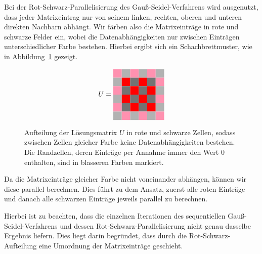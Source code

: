 \documentclass{article}
\begin{document}
Bei der Rot-Schwarz-Parallelisierung des Gauß-Seidel-Verfahrens wird ausgenutzt, dass jeder Matrixeintrag nur von seinem linken, rechten, oberen und unteren direkten Nachbarn abhängt. Wir färben also die Matrixeinträge in rote und schwarze Felder ein, wobei die Datenabhängigkeiten nur zwischen Einträgen unterschiedlicher Farbe bestehen. Hierbei ergibt sich ein Schachbrettmuster, wie in Abbildung~\ref{fig:matrix} gezeigt.

\begin{figure}[h!]
\centering
$$U = 
\begin{tabular}{cccccc}
  \cellcolor{rose} & \cellcolor[gray]{0.7} & \cellcolor{rose} & \cellcolor[gray]{0.7} & \cellcolor{rose} & \cellcolor[gray]{0.7}\\
 \cellcolor[gray]{0.7} & \cellcolor{red} & \cellcolor[gray]{0.45} & \cellcolor{red} & \cellcolor[gray]{0.45} & \cellcolor{rose}\\
  \cellcolor{rose} & \cellcolor[gray]{0.45} & \cellcolor{red} & \cellcolor[gray]{0.45} & \cellcolor{red} & \cellcolor[gray]{0.7}\\
 \cellcolor[gray]{0.7} & \cellcolor{red} & \cellcolor[gray]{0.45} & \cellcolor{red} & \cellcolor[gray]{0.45} & \cellcolor{rose} \\
 \cellcolor{rose} & \cellcolor[gray]{0.45} & \cellcolor{red} & \cellcolor[gray]{0.45} & \cellcolor{red} & \cellcolor[gray]{0.7}\\
 \cellcolor[gray]{0.7} & \cellcolor{rose} & \cellcolor[gray]{0.7} & \cellcolor{rose} & \cellcolor[gray]{0.7} & \cellcolor{rose}\\
\end{tabular}
$$
\caption{Aufteilung der Lösungsmatrix $U$ in rote und schwarze Zellen, sodass zwischen Zellen gleicher Farbe keine Datenabhängigkeiten bestehen. Die Randzellen, deren Einträge per Annahme immer den Wert $0$ enthalten, sind in blasseren Farben markiert.}
\label{fig:matrix}
\end{figure}

Da die Matrixeinträge gleicher Farbe nicht voneinander abhängen, können wir diese parallel berechnen. Dies führt zu dem Ansatz, zuerst alle roten Einträge und danach alle schwarzen Einträge jeweils parallel zu berechnen.

Hierbei ist zu beachten, dass die einzelnen Iterationen des sequentiellen Gauß-Seidel-Verfahrens und dessen Rot-Schwarz-Parallelisierung nicht genau dasselbe Ergebnis liefern. Dies liegt darin begründet, dass durch die Rot-Schwarz-Aufteilung eine Umordnung der Matrixeinträge geschieht.
\end{document}
